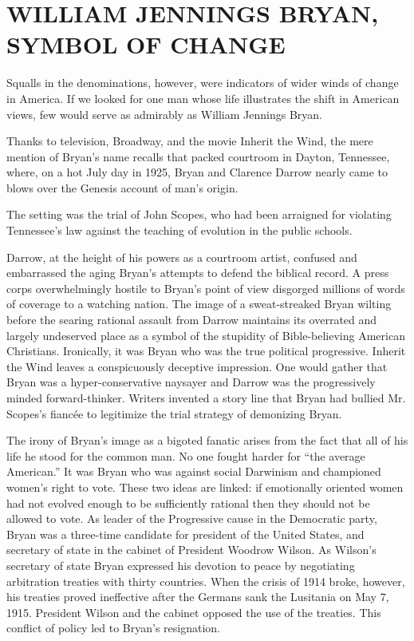 \section{WILLIAM JENNINGS BRYAN, SYMBOL OF CHANGE}

Squalls in the denominations, however, were indicators of wider winds of change in America. If we
looked for one man whose life illustrates the shift in American views, few would serve as admirably
as William Jennings Bryan.

Thanks to television, Broadway, and the movie Inherit the Wind, the mere mention of Bryan’s name
recalls that packed courtroom in Dayton, Tennessee, where, on a hot July day in 1925, Bryan and
Clarence Darrow nearly came to blows over the Genesis account of man’s origin.

The setting was the trial of John Scopes, who had been arraigned for violating Tennessee’s law
against the teaching of evolution in the public schools.

Darrow, at the height of his powers as a courtroom artist, confused and embarrassed the aging
Bryan’s attempts to defend the biblical record. A press corps overwhelmingly hostile to Bryan’s
point of view disgorged millions of words of coverage to a watching nation. The image of a
sweat-streaked Bryan wilting before the searing rational assault from Darrow maintains its overrated
and largely undeserved place as a symbol of the stupidity of Bible-believing American Christians.
Ironically, it was Bryan who was the true political progressive. Inherit the Wind leaves a
conspicuously deceptive impression. One would gather that Bryan was a hyper-conservative naysayer
and Darrow was the progressively minded forward-thinker. Writers invented a story line that Bryan
had bullied Mr. Scopes’s fiancée to legitimize the trial strategy of demonizing Bryan.

The irony of Bryan’s image as a bigoted fanatic arises from the fact that all of his life he stood
for the common man. No one fought harder for “the average American.” It was Bryan who was against
social Darwinism and championed women’s right to vote. These two ideas are linked: if emotionally
oriented women had not evolved enough to be sufficiently rational then they should not be allowed to
vote. As leader of the Progressive cause in the Democratic party, Bryan was a three-time candidate
for president of the United States, and secretary of state in the cabinet of President Woodrow
Wilson. As Wilson’s secretary of state Bryan expressed his devotion to peace by negotiating
arbitration treaties with thirty countries. When the crisis of 1914 broke, however, his treaties
proved ineffective after the Germans sank the Lusitania on May 7, 1915. President Wilson and the
cabinet opposed the use of the treaties. This conflict of policy led to Bryan’s resignation.

